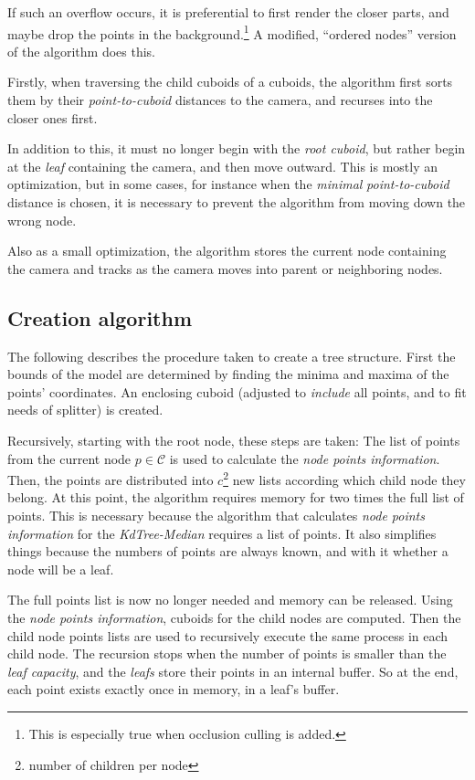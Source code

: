 \documentclass[a4paper,10pt,abstracton,notitlepage]{scrreprt}
\begin{document}
If such an overflow occurs, it is preferential to first render the closer parts, and maybe drop the points in the background.\footnote{This is especially true when occlusion culling is added.} A modified, ``ordered nodes'' version of the algorithm does this.

Firstly, when traversing the child cuboids of a cuboids, the algorithm first sorts them by their \emph{point-to-cuboid} distances to the camera, and recurses into the closer ones first.

In addition to this, it must no longer begin with the \emph{root cuboid}, but rather begin at the \emph{leaf} containing the camera, and then move outward. This is mostly an optimization, but in some cases, for instance when the \emph{minimal} \emph{point-to-cuboid} distance is chosen, it is necessary to prevent the algorithm from moving down the wrong node.

Also as a small optimization, the algorithm stores the current node containing the camera and tracks as the camera moves into parent or neighboring nodes.

\subsection{Creation algorithm}
The following describes the procedure taken to create a tree structure. First the bounds of the model are determined by finding the minima and maxima of the points' coordinates. An enclosing cuboid (adjusted to \emph{include} all points, and to fit needs of splitter) is created.

Recursively, starting with the root node, these steps are taken: The list of points from the current node $p \in \mathcal{C}$ is used to calculate the \emph{node points information}. Then, the points are distributed into $c$\footnote{number of children per node} new lists according which child node they belong. At this point, the algorithm requires memory for two times the full list of points. This is necessary because the algorithm that calculates \emph{node points information} for the \emph{KdTree-Median} requires a list of points. It also simplifies things because the numbers of points are always known, and with it whether a node will be a leaf.

The full points list is now no longer needed and memory can be released. Using the \emph{node points information}, cuboids for the child nodes are computed. Then the child node points lists are used to recursively execute the same process in each child node. The recursion stops when the number of points is smaller than the \emph{leaf capacity}, and the \emph{leafs} store their points in an internal buffer. So at the end, each point exists exactly once in memory, in a leaf's buffer.
\end{document}
